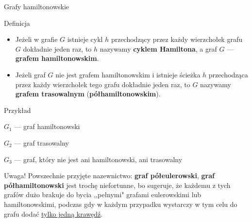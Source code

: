 \documentclass[a4paper,10pt]{beamer}
\begin{document}
\begin{frame}{Grafy hamiltonowskie}
	
\begin{block}{Definicja}
\begin{itemize}
	\item	Jeżeli w grafie $G$ istnieje cykl $h$ przechodzący przez każdy wierzchołek grafu $G$ dokładnie jeden raz, to $h$ nazywamy {\bf cyklem Hamiltona}, a graf $G$ --- {\bf grafem hamiltonowskim}.
	\item Jeżeli graf $G$ nie jest grafem hamiltonowskim i istnieje ścieżka $h$ przechodząca przez każdy wierzchołek tego grafu dokładnie jeden raz, to $G$ nazywamy {\bf grafem trasowalnym} ({\bf półhamiltonowskim}).
\end{itemize}
\end{block}

\medskip

\begin{exampleblock}{Przykład}
		\begin{minipage}{.55\textwidth}
			\begin{center}
				
			\end{center}
		\end{minipage}
\hfill
		\begin{minipage}{.4\textwidth}
$G_1$ --- graf hamiltonowski

\medskip

$G_2$ --- graf trasowalny

\medskip

$G_3$ --- graf, który nie jest ani hamiltonowski, ani trasowalny
		\end{minipage}
\end{exampleblock}

\end{frame}

\begin{frame}

\begin{alertblock}{Uwaga!}
Powszechnie przyjęte nazewnictwo: {\bf graf półeulerowski}, {\bf graf półhamiltonowski} jest trochę niefortunne, bo sugeruje, że każdemu z tych grafów dużo brakuje do bycia ,,pełnymi" grafami eulerowskimi lub hamiltonowskimi, podczas gdy w każdym przypadku wystarczy w tym celu do grafu dodać \underline{tylko jedną krawędź}.
\end{alertblock}

\end{frame}
\end{document}
